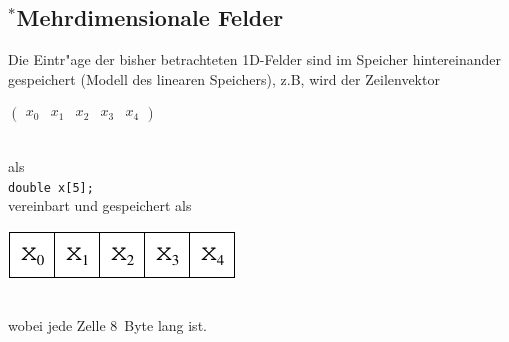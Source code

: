 \subsection{\mbox{}$^{*}$Mehrdimensionale Felder}
\label{sec:5.1.5}
%
Die Eintr"age der bisher betrachteten 1D-Felder sind im
Speicher hintereinander gespeichert (Modell des linearen Speichers), z.B,
wird der Zeilenvektor
\\[0.5ex]
\centerline{$\begin{pmatrix} x_0 & x_1 & x_2 & x_3 & x_4 \end{pmatrix}$}
\\
als
\\
%
\mbox{} \hfill\verb|double x[5];| \hfill\mbox{}
%
\\
vereinbart und gespeichert als
\\
\centerline{\includegraphics[scale=0.9]{kap512a.pdf}}
\\
wobei jede Zelle 8~Byte lang ist.

